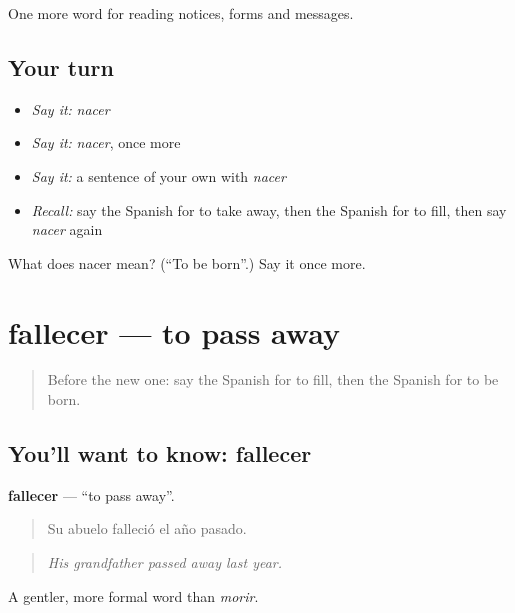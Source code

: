 \begin{grammarlens}[title={What you've built}]
One more word for reading notices, forms and messages.
\end{grammarlens}

\subsection*{Your turn}
\begin{itemize}
\raggedright
  \item \emph{Say it:} \emph{nacer}
  \item \emph{Say it:} \emph{nacer}, once more
  \item \emph{Say it:} a sentence of your own with \emph{nacer}
  \item \emph{Recall:} say the Spanish for to take away, then the Spanish for to fill, then say \emph{nacer} again
\end{itemize}

\begin{tcolorbox}[breakable,colback=teal!4,colframe=teal!35!black,title={Before you move on}]
What does nacer mean? (\textquotedblleft{}To be born\textquotedblright{}.) Say it once more.
\end{tcolorbox}
\section[fallecer]{fallecer — to pass away}

\label{lesson:ES-C497-fallecer}



\begin{quote}
Before the new one: say the Spanish for to fill, then the Spanish for to be born.
\end{quote}

\subsection*{You'll want to know: fallecer}
\textbf{fallecer} — \textquotedblleft{}to pass away\textquotedblright{}.

\begin{quote}
Su abuelo falleció el año pasado.
\end{quote}

\begin{quote}
\emph{His grandfather passed away last year.}
\end{quote}

A gentler, more formal word than \emph{morir}.


